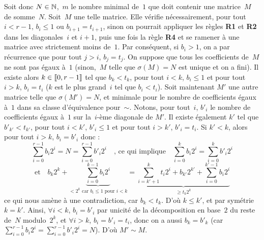 Soit  donc $N  \in  \mathbb{N}$,~$m$ le  nombre  minimal de~$1$  que  doit contenir  une
matrice~$M$   de  somme~$N$.    
Soit~$M$  une   telle  matrice.    Elle  vérifie
néces\-saire\-ment, pour tout $i<r-1$,  $b_i \leq 1$ ou $b_{i+1}=t_{i+1}$, sinon
on  pourrait   appliquer  les  règles   \textbf{R1}  et  \textbf{R2}   dans  les
diagonales~$i$ et $i+1$, puis une fois  la règle \textbf{R4} et se ramener à une
matrice avec strictement  moins de~$1$.  Par conséquent, si $b_i >  1$, on a par
récurrence  que  pour  tout  $j>i$,  $b_j  = t_j$.   On  suppose  que  tous  les
coefficients de~$M$ ne  sont pas égaux à~$1$ (sinon,~$M$  telle que $\sigma(M) =
N$ est  unique et on a fini).   Il existe alors $k  \in [\kern-0.15em [ 0, r-1  ]\kern-0.15em]$ tel que
$b_k<t_k$, pour tout $i<k$, $b_i \leq  1$ et pour tout $i>k$, $b_i=t_i$ ($k$ est
le plus grand~$i$ tel que $b_i < t_i$).
Soit maintenant  $M'$ une autre matrice  telle que $\sigma  (M')=N$, et minimale
pour  le  nombre  de  coefficients  égaux à~$1$  dans  sa  classe  d'équivalence
pour~$\sim$. Notons, pour tout~$i$, $b'_i$ le nombre de coefficients égaux à~$1$
sur la~$i$-ème  diagonale de $M'$. Il  existe également $k'$ tel  que $b'_{k'} <
t_{k'}$, pour  tout $i<k'$, $b'_i  \leq 1$ et  pour tout $i>k'$,  $b'_i=t_i$. Si
$k'<k$, alors pour tout $i>k$, $b_i= b'_i$ donc :
\vspace{-1em}
\begin{equation*}
  \sum\limits_{i=0}^{r-1}b_i 2^i = N = \sum\limits_{i=0}^{r-1}b'_i 2^i
  \quad\text{, ce qui implique}\quad \sum\limits_{i=0}^k b_i 2^i = \sum\limits_{i=0}^k b'_i 2^i
\end{equation*}
\begin{equation*}
  \text{et}\quad b_k 2^k + \underbrace{\sum\limits_{i=0}^{k-1} b_i 2^i}_{\text{$< 2^k$ car $b_i \leq 1$ pour $i<k$}} =\underbrace{\sum\limits_{i=k'+1}^k t_i 2^i + b_{k'} 2^{k'} + \sum\limits_{i=0}^{k' -1} b_i 2^i}_{\geq t_k 2^k}
\end{equation*}
ce qui nous amène  à une contradiction, car $b_k<t_k$. D'où $k  \leq k'$, et par
symétrie  $k =  k'$.  Ainsi,  $\forall i<k$,  $b_i  = b'_i$  par  unicité de  la
décomposition en base~$2$ du reste de~$N$ modulo~$2^k$, et $\forall i>k$, $b_i =
b'_i = t_i$, donc on a  aussi $b_k = b'_k$ (car $\sum\limits_{i=0}^{r-1} b_i 2^i
= \sum\limits_{i=0}^{r-1} b'_i 2^i = N$).  D'où $M' \sim M$.

